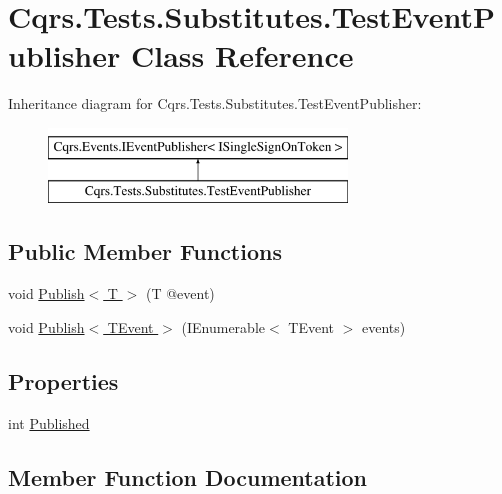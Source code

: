\hypertarget{classCqrs_1_1Tests_1_1Substitutes_1_1TestEventPublisher}{}\section{Cqrs.\+Tests.\+Substitutes.\+Test\+Event\+Publisher Class Reference}
\label{classCqrs_1_1Tests_1_1Substitutes_1_1TestEventPublisher}
Inheritance diagram for Cqrs.\+Tests.\+Substitutes.\+Test\+Event\+Publisher\+:\begin{figure}[H]
\begin{center}
\leavevmode
\includegraphics[height=2.000000cm]{classCqrs_1_1Tests_1_1Substitutes_1_1TestEventPublisher}
\end{center}
\end{figure}
\subsection*{Public Member Functions}
\begin{DoxyCompactItemize}
\item 
void \hyperlink{classCqrs_1_1Tests_1_1Substitutes_1_1TestEventPublisher_a4a2b02804dc0afae8286aefc83a04f37}{Publish$<$ T $>$} (T @event)
\item 
void \hyperlink{classCqrs_1_1Tests_1_1Substitutes_1_1TestEventPublisher_adbfefbd0acaa4f7a89344f54871f3943}{Publish$<$ T\+Event $>$} (I\+Enumerable$<$ T\+Event $>$ events)
\end{DoxyCompactItemize}
\subsection*{Properties}
\begin{DoxyCompactItemize}
\item 
int \hyperlink{classCqrs_1_1Tests_1_1Substitutes_1_1TestEventPublisher_ab4004d3927bdc8133f690b68a81b9d0c}{Published}
\end{DoxyCompactItemize}


\subsection{Member Function Documentation}
\mbox{\label{classCqrs_1_1Tests_1_1Substitutes_1_1TestEventPublisher_a4a2b02804dc0afae8286aefc83a04f37}} 
